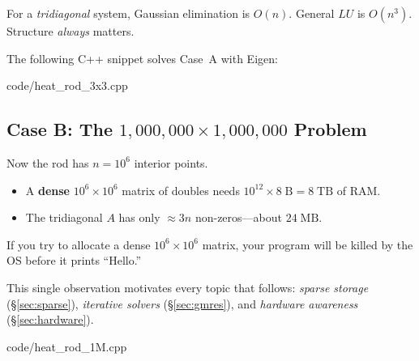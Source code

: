 \begin{remark}
For a \emph{tridiagonal} system, Gaussian elimination is $O(n)$.
General $LU$ is $O(n^3)$.  Structure \emph{always} matters.
\end{remark}

The following C++ snippet solves Case~A with Eigen:


                {code/heat_rod_3x3.cpp}

\subsection{Case B: The $1{,}000{,}000 \times 1{,}000{,}000$ Problem}

Now the rod has $n = 10^6$ interior points.

\begin{itemize}[nosep]
    \item A \textbf{dense} $10^6 \times 10^6$ matrix of doubles needs
          $10^{12} \times 8\;\text{B} = 8\;\text{TB}$ of RAM.
    \item The tridiagonal $A$ has only $\approx 3n$ non-zeros---about
          $24\;\text{MB}$.
\end{itemize}

\begin{warningbox}
If you try to allocate a dense $10^6 \times 10^6$ matrix,
your program will be killed by the OS before it prints ``Hello.''
\end{warningbox}

This single observation motivates every topic that follows:
\emph{sparse storage} (\S\ref{sec:sparse}),
\emph{iterative solvers} (\S\ref{sec:gmres}),
and \emph{hardware awareness} (\S\ref{sec:hardware}).


                {code/heat_rod_1M.cpp}
